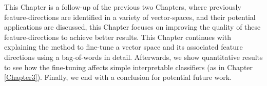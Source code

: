 



  



This Chapter is a follow-up of the previous two Chapters, where previously feature-directions are identified in a variety of vector-spaces, and their potential applications are discussed, this Chapter focuses on improving the quality of these feature-directions to achieve better results. This Chapter continues with explaining the method to fine-tune a vector space and its associated feature directions using a bag-of-words in detail. Afterwards, we show  quantitative results to see how the fine-tuning affects simple interpretable classifiers (as in Chapter \ref{Chapter3}). Finally, we end with a conclusion for potential future work.





